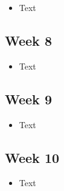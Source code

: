 \documentclass[10pt, onecolumn, draftclsnofoot, letterpaper, compsoc]{IEEEtran}
\begin{document}
\begin{itemize}

\item Text

\end{itemize}

\subsection{Week 8}

\begin{itemize}

\item Text

\end{itemize}

\subsection{Week 9}

\begin{itemize}

\item Text

\end{itemize}

\subsection{Week 10}

\begin{itemize}

\item Text

\end{itemize}
\end{document}
